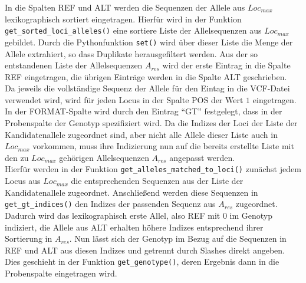 In die Spalten REF und ALT werden die Sequenzen der Allele aus $Loc_{max}$ lexikographisch sortiert eingetragen. Hierfür wird in der Funktion \lstinline|get_sorted_loci_alleles()| eine sortiere Liste der Allelsequenzen aus $Loc_{max}$ gebildet. Durch die Pythonfunktion \lstinline|set()| wird über dieser Liste die Menge der Allele extrahiert, so dass Duplikate herausgefiltert werden. Aus der so entstandenen Liste der Allelsequenzen $A_{res}$ wird der erste Eintrag in die Spalte REF eingetragen, die übrigen Einträge werden in die Spalte ALT geschrieben.\\

Da jeweils die vollständige Sequenz der Allele für den Eintag in die VCF-Datei verwendet wird, wird für jeden Locus in der Spalte POS der Wert $1$ eingetragen. \\

In der FORMAT-Spalte wird durch den Eintrag ``GT'' festgelegt, dass in der Probenspalte der Genotyp spezifiziert wird. Da die Indizes der Loci der Liste der Kandidatenallele zugeordnet sind, aber nicht alle Allele dieser Liste auch in $Loc_{max}$ vorkommen, muss ihre Indizierung nun auf die bereits erstellte Liste mit den zu $Loc_{max}$ gehörigen Allelsequenzen $A_{res}$ angepasst werden. \\

Hierfür werden in der Funktion \lstinline|get_alleles_matched_to_loci()| zunächst jedem Locus aus $Loc_{max}$ die entsprechenden Sequenzen aus der Liste der Kandidatenallele zugeordnet. Anschließend werden diese Sequenzen in \lstinline|get_gt_indices()| den Indizes der passenden Sequenz aus $A_{res}$ zugeordnet. Dadurch wird das lexikographisch erste Allel, also REF mit 0 im Genotyp indiziert, die Allele aus ALT erhalten höhere Indizes entsprechend ihrer Sortierung in $A_{res}$. Nun lässt sich der Genotyp im Bezug auf die Sequenzen in REF und ALT aus diesen Indizes und getrennt durch Slashes direkt angeben. Dies geschieht in der Funktion \lstinline|get_genotype()|, deren Ergebnis dann in die Probenspalte eingetragen wird.\\
\let\cleardoublepage\clearpage


